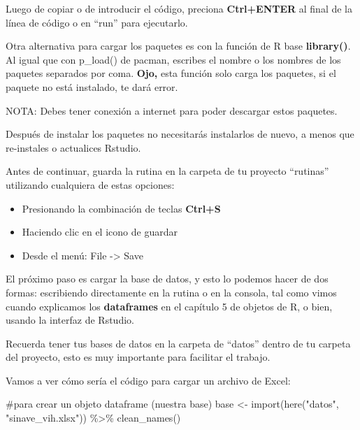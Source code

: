 \documentclass[
  letterpaper,
  DIV=11,
  numbers=noendperiod]{scrreprt}
\newenvironment{Shaded}{\begin{snugshade}}{\end{snugshade}}
\newcommand{\CommentTok}[1]{\textcolor[rgb]{0.37,0.37,0.37}{#1}}
\newcommand{\FunctionTok}[1]{\textcolor[rgb]{0.28,0.35,0.67}{#1}}
\newcommand{\NormalTok}[1]{\textcolor[rgb]{0.00,0.23,0.31}{#1}}
\newcommand{\OtherTok}[1]{\textcolor[rgb]{0.00,0.23,0.31}{#1}}
\newcommand{\SpecialCharTok}[1]{\textcolor[rgb]{0.37,0.37,0.37}{#1}}
\newcommand{\StringTok}[1]{\textcolor[rgb]{0.13,0.47,0.30}{#1}}
\begin{document}
Luego de copiar o de introducir el código, preciona \textbf{Ctrl+ENTER}
al final de la línea de código o en ``run'' para ejecutarlo.

Otra alternativa para cargar los paquetes es con la función de R base
\textbf{library()}. Al igual que con p\_load() de pacman, escribes el
nombre o los nombres de los paquetes separados por coma. \textbf{Ojo,}
esta función solo carga los paquetes, si el paquete no está instalado,
te dará error.

NOTA: Debes tener conexión a internet para poder descargar estos
paquetes.

Después de instalar los paquetes no necesitarás instalarlos de nuevo, a
menos que re-instales o actualices Rstudio.

Antes de continuar, guarda la rutina en la carpeta de tu proyecto
``rutinas'' utilizando cualquiera de estas opciones:

\begin{itemize}
\item
  Presionando la combinación de teclas \textbf{Ctrl+S}
\item
  Haciendo clic en el icono de guardar
\item
  Desde el menú: File -\textgreater{} Save
\end{itemize}

El próximo paso es cargar la base de datos, y esto lo podemos hacer de
dos formas: escribiendo directamente en la rutina o en la consola, tal
como vimos cuando explicamos los \textbf{dataframes} en el capítulo 5 de
objetos de R, o bien, usando la interfaz de Rstudio.

Recuerda tener tus bases de datos en la carpeta de ``datos'' dentro de
tu carpeta del proyecto, esto es muy importante para facilitar el
trabajo.

Vamos a ver cómo sería el código para cargar un archivo de Excel:

\begin{Shaded}
\begin{Highlighting}[]
\CommentTok{\#para crear un objeto dataframe (nuestra base)}
\NormalTok{base }\OtherTok{\textless{}{-}} \FunctionTok{import}\NormalTok{(}\FunctionTok{here}\NormalTok{(}\StringTok{"datos"}\NormalTok{, }\StringTok{"sinave\_vih.xlsx"}\NormalTok{)) }\SpecialCharTok{\%\textgreater{}\%} 
         \FunctionTok{clean\_names}\NormalTok{()}
\end{Highlighting}
\end{Shaded}
\end{document}
